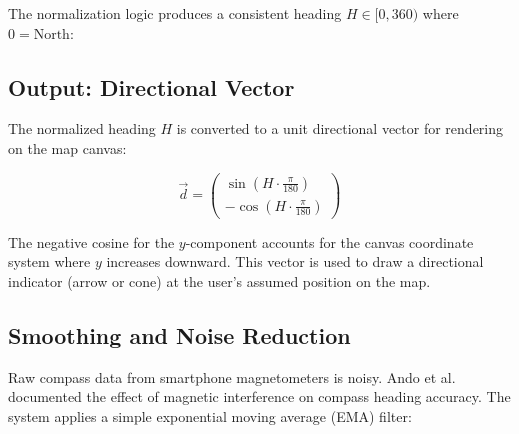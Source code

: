 The normalization logic produces a consistent heading $H \in [0, 360)$ where $0 = \text{North}$:

\begin{algorithm}[H]
\caption{Compass Heading Normalization}
\label{alg:heading-normalize}
\SetAlgoLined
{}
\KwOut{Normalized heading $H$ in degrees from North, $[0, 360)$}

\BlankLine
{}

\BlankLine
{}\;
\end{algorithm}

\subsection{Output: Directional Vector}

The normalized heading $H$ is converted to a unit directional vector for rendering on the map canvas:

\begin{equation}
\vec{d} = \begin{pmatrix} \sin(H \cdot \frac{\pi}{180}) \\ -\cos(H \cdot \frac{\pi}{180}) \end{pmatrix}
\label{eq:heading-vector}
\end{equation}

The negative cosine for the $y$-component accounts for the canvas coordinate system where $y$ increases downward. This vector is used to draw a directional indicator (arrow or cone) at the user's assumed position on the map.

\subsection{Smoothing and Noise Reduction}

Raw compass data from smartphone magnetometers is noisy. Ando et al.\ \cite{Ando2016} documented the effect of magnetic interference on compass heading accuracy. The system applies a simple exponential moving average (EMA) filter:


